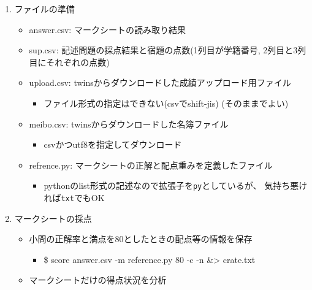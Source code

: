 \begin{enumerate}
\item ファイルの準備

\begin{itemize}
\item answer.csv: マークシートの読み取り結果

\item sup.csv: 記述問題の採点結果と宿題の点数(1列目が学籍番号, 2列目と3列目にそれぞれの点数)

\item upload.csv: twinsからダウンロードした成績アップロード用ファイル

\begin{itemize}
\item ファイル形式の指定はできない(csvでshift-jis) (そのままでよい)

\end{itemize}

\item meibo.csv: twinsからダウンロードした名簿ファイル

\begin{itemize}
\item csvかつutf8を指定してダウンロード

\end{itemize}

\item refrence.py: マークシートの正解と配点重みを定義したファイル

\begin{itemize}
\item pythonのlist形式の記述なので拡張子を\texttt{py}としているが、
気持ち悪ければ\texttt{txt}でもOK

\end{itemize}

\end{itemize}

\item マークシートの採点

\begin{itemize}
\item 小問の正解率と満点を80としたときの配点等の情報を保存

\begin{itemize}
\item \$ score answer.csv -m reference.py 80 -c -n \&> crate.txt

\end{itemize}

\item マークシートだけの得点状況を分析


\end{itemize}
\end{enumerate}
